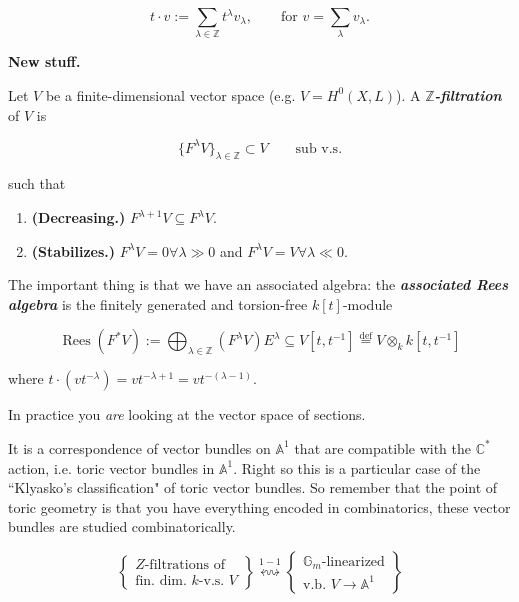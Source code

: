 $$
t\cdot v:= \sum_{\lambda \in
\mathbb{Z}}t^\lambda v_\lambda,\qquad
\text{for } v = \sum_{\lambda}v_\lambda.
$$

\textbf{New stuff.}

\begin{definition}
\label{definition-montero-1}
Let $V$ be a finite-dimensional vector space
(e.g. $V= H^{0}(X,L)$). A
\textit{\textbf{$\mathbb{Z}$-filtration}} of
$V$ is

$$
\{F^\lambda V\}_{\lambda \in
\mathbb{Z}}\subset V\qquad \text{sub v.s.}
$$

such that
\begin{enumerate}
\item \textbf{(Decreasing.)} $F^{\lambda +1}V
\subseteq F^{\lambda}V$.
\item \textbf{(Stabilizes.)} $F^\lambda V=0
\forall \lambda \gg 0$ and $F^{\lambda}V=V
\forall  \lambda \ll 0$.
\end{enumerate}
The important thing is that we have an
associated algebra: the
\textit{\textbf{associated Rees algebra}} is
the finitely generated and torsion-free
$k[t]$-module

$$
\operatorname{Rees}(F^*
V):=\bigoplus_{\lambda \in
\mathbb{Z}}(F^\lambda V) E^\lambda \subseteq
V[t,t^{-1}] \overset{\operatorname{def}}{=} V
\otimes_k k[t,t^{-1}]
$$

where $t \cdot (vt^{-\lambda})=v t ^{-
\lambda +1}= vt^{-(\lambda-1)}$.
\end{definition}

\begin{remark}
\label{remark-montero-2}
In practice you \textit{are} looking at the
vector space of sections.
\end{remark}

\medskip{}

It is a correspondence of vector bundles on
$\mathbb{A}^1$ that are compatible with the
$\mathbb{C}^*$ action, i.e. toric vector
bundles in $\mathbb{A}^1$. Right so this is a
particular case of the ``Klyasko's
classification" of toric vector bundles. So
remember that the point of toric geometry is
that you have everything encoded in
combinatorics, these vector bundles are
studied combinatorically.

$$
\left\{ \substack{\text{$Z$-filtrations of}
\\ \text{fin. dim. $k$-v.s. $V$} } \right\}
\overset{1-1}{\leftrightsquigarrow}\left\{
\substack{\mathbb{G}_m \text{-linearized}  \\
\text{v.b. $V \to \mathbb{A}^1$} } \right\}
$$

